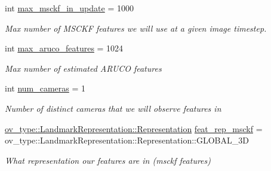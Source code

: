 \begin{DoxyCompactItemize}
\mbox{\label{structov__msckf_1_1StateOptions_a6fb28c6eb0838363eee0ce37a2828ed9}} 
int \hyperlink{structov__msckf_1_1StateOptions_a6fb28c6eb0838363eee0ce37a2828ed9}{max\+\_\+msckf\+\_\+in\+\_\+update} = 1000
\begin{DoxyCompactList}\small\item\em Max number of M\+S\+C\+KF features we will use at a given image timestep. \end{DoxyCompactList}\item 
\mbox{\label{structov__msckf_1_1StateOptions_ad26177fc751cdcf12e9e19ef698f91eb}} 
int \hyperlink{structov__msckf_1_1StateOptions_ad26177fc751cdcf12e9e19ef698f91eb}{max\+\_\+aruco\+\_\+features} = 1024
\begin{DoxyCompactList}\small\item\em Max number of estimated A\+R\+U\+CO features \end{DoxyCompactList}\item 
\mbox{\label{structov__msckf_1_1StateOptions_a1de43b7611b68b3bbae742adfd0e20e5}} 
int \hyperlink{structov__msckf_1_1StateOptions_a1de43b7611b68b3bbae742adfd0e20e5}{num\+\_\+cameras} = 1
\begin{DoxyCompactList}\small\item\em Number of distinct cameras that we will observe features in \end{DoxyCompactList}\item 
\mbox{\label{structov__msckf_1_1StateOptions_a385de6983ebba82af2215898610aed36}} 
\hyperlink{classov__type_1_1LandmarkRepresentation_a7f5783df6932ace7f098ae243b6d298e}{ov\+\_\+type\+::\+Landmark\+Representation\+::\+Representation} \hyperlink{structov__msckf_1_1StateOptions_a385de6983ebba82af2215898610aed36}{feat\+\_\+rep\+\_\+msckf} = ov\+\_\+type\+::\+Landmark\+Representation\+::\+Representation\+::\+G\+L\+O\+B\+A\+L\+\_\+3D
\begin{DoxyCompactList}\small\item\em What representation our features are in (msckf features) \end{DoxyCompactList}\item 
\mbox{\label{structov__msckf_1_1StateOptions_a426ea4e9c3f5f269eddb356e9e7feb6c}} 

\end{DoxyCompactItemize}
